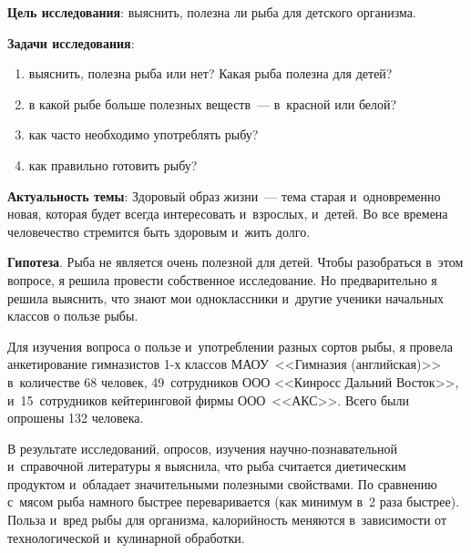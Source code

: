 


\makeProcTitleSchool




\textbf{Цель исследования}: выяснить, полезна ли рыба для детского организма.

\textbf{Задачи исследования}:
\begin{enumerate}[noitemsep]\vspace{-8pt}
\item выяснить, полезна рыба или нет? Какая рыба полезна для детей?
\item в какой рыбе больше полезных веществ~--- в~красной или белой?
\item как часто необходимо употреблять рыбу?
\item как правильно готовить рыбу?
\end{enumerate}\vspace{-8pt}

\textbf{Актуальность темы}: Здоровый образ жизни~--- тема старая и~одновременно новая, которая будет всегда интересовать и~взрослых, и~детей. Во все времена человечество стремится быть здоровым и~жить долго.

\textbf{Гипотеза}. Рыба не является очень полезной для детей. Чтобы разобраться в~этом вопросе, я решила провести собственное исследование. Но предварительно я решила выяснить, что знают мои одноклассники и~другие ученики начальных классов о пользе рыбы.

Для изучения вопроса о пользе и~употреблении разных сортов рыбы, я провела анкетирование гимназистов 1-х классов МАОУ~<<Гимназия (английская)>> в~количестве 68 человек, 49~сотрудников ООО <<Кинросс Дальний Восток>>, и~15~сотрудников кейтеринговой фирмы ООО~<<АКС>>. Всего были опрошены 132 человека.

В результате исследований, опросов, изучения научно-познавательной и~справочной литературы я выяснила, что рыба считается диетическим продуктом и~обладает значительными полезными свойствами. По сравнению с~мясом рыба намного быстрее переваривается (как минимум в~2 раза быстрее). Польза и~вред рыбы для организма, калорийность меняются в~зависимости от технологической и~кулинарной обработки.

